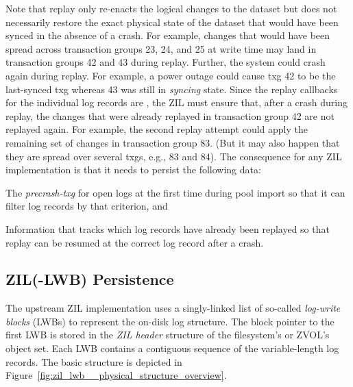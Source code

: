 \documentclass[12pt,a4paper,twoside]{book}
\begin{document}
Note that replay only re-enacts the logical changes to the dataset but does not necessarily restore the exact physical state of the dataset that would have been synced in the absence of a crash.
For example, changes that would have been spread across transaction groups 23, 24, and 25 at write time may land in transaction groups 42 and 43 during replay.
Further, the system could crash again during replay.
For example, a power outage could cause txg 42 to be the last-synced txg whereas 43 was still in \textit{syncing} state.
Since the replay callbacks for the individual log records are \underline{}, the ZIL must ensure that, after a crash during replay, the changes that were already replayed in transaction group 42 are not replayed again.
For example, the second replay attempt could apply the remaining set of changes in transaction group 83.
(But it may also happen that they are spread over several txgs, e.g., 83 and 84).
The consequence for any ZIL implementation is that it needs to persist the following data:
\begin{description}[noitemsep,leftmargin=1.5cm,labelindent=1cm]
    \item[Precrash-txg] The \textit{precrash-txg} for open logs at the first time during pool import so that it can filter log records by that criterion, and
    \item[Replay progress] Information that tracks which log records have already been replayed so that replay can be resumed at the correct log record after a crash.
\end{description}

\subsection{ZIL(-LWB) Persistence}\label{ch:openzfs_background:zillwb_persistence}

The upstream ZIL implementation uses a singly-linked list of so-called \textit{log-write blocks} (LWBs) to represent the on-disk log structure.
The block pointer to the first LWB is stored in the \textit{ZIL header} structure of the filesystem's or ZVOL's object set.
Each LWB contains a contiguous sequence of the variable-length log records.
The basic structure is depicted in Figure~\ref{fig:zil_lwb__physical_structure_overview}.
\end{document}
